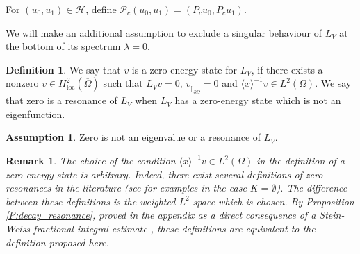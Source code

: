 \documentclass[10pt,leqno]{amsart}
\newtheorem{remark}[theorem]{Remark}
\theoremstyle{definition}%
\newtheorem{definition}[theorem]{Definition}
\newtheorem{assumption}{Assumption}
\theoremstyle{remark}
\numberwithin{equation}{section}
\renewcommand{\^}{\widehat}%
\begin{document}
For $(u_0,u_1)\in\mathcal{H}$, define $\mathcal{P}_c(u_0,u_1)=(P_cu_0,P_c u_1)$.



We will make an additional assumption to exclude a singular behaviour of $L_V$ at the bottom of its spectrum $\lambda=0$.
\begin{definition}
	\label{def:resonance} 
	We say that $v$ is a zero-energy state for $L_V$, if there exists a 
	nonzero $v\in H^2_{\mathrm{loc}}(\overline{\Omega})$ such that $L_V v=0$, $v_{\restriction_{\partial\Omega}}=0$ and
	$\langle x \rangle^{-1} v\in L^2(\Omega)$. We say that zero is a resonance of $L_V$ when $L_V$ has a zero-energy state which is not an eigenfunction.
\end{definition}
\begin{assumption}
 \label{As:zero}
 Zero is not an eigenvalue or a resonance of $L_V$.
\end{assumption}
\begin{remark}
\label{R:resonance}
 The choice of the condition $\langle x \rangle^{-1} v\in L^2(\Omega)$ in the definition of a zero-energy state is arbitrary. Indeed, there exist several definitions of zero-resonances in the literature (see for examples  \cite{RodnianskiTao15,DAncona20} in the case $K=\emptyset$). The difference between these definitions is the weighted $L^2$ space which is chosen. By Proposition \ref{P:decay_resonance}, proved in the appendix as a direct consequence of a Stein-Weiss fractional integral estimate \cite{SW58}, these definitions are equivalent to the definition proposed here. 
 \end{remark}
\end{document}
